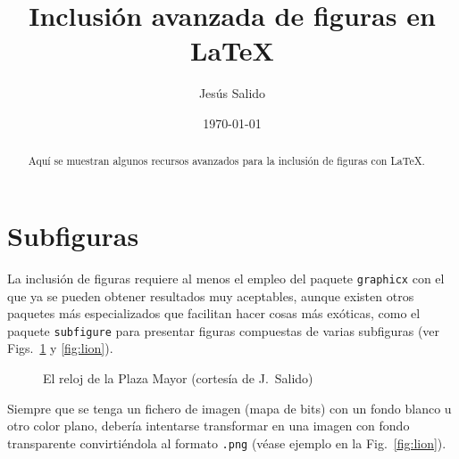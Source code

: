 \documentclass[11pt,a4paper]{article}
\author{Jesús Salido}
\title{Inclusión avanzada de figuras en \LaTeX{}}
\date{\today}
\begin{document}
\maketitle

\begin{abstract}
	Aquí se muestran algunos recursos avanzados para la inclusión de figuras con \LaTeX{}.
\end{abstract}

\tableofcontents
\listoffigures


\section{Subfiguras}
La inclusión de figuras requiere al menos el empleo del paquete \texttt{graphicx} con el que ya se pueden obtener resultados muy aceptables, aunque existen otros paquetes más especializados que facilitan hacer cosas más exóticas, como el paquete \texttt{subfigure} para presentar figuras compuestas de varias subfiguras (ver Figs.~\ref{fig:clock} y \ref{fig:lion}).


\begin{figure}[htb]
	\centering
	\caption[Comparación jpg color y niveles de gris]{El reloj de la Plaza Mayor (cortesía de J.~Salido)}
	\label{fig:clock}
\end{figure}

Siempre que se tenga un fichero de imagen (mapa de bits) con un fondo blanco u otro color plano, debería intentarse transformar en una imagen con fondo transparente convirtiéndola al formato \texttt{.png} (véase ejemplo en la Fig.~\ref{fig:lion}).
\end{document}
